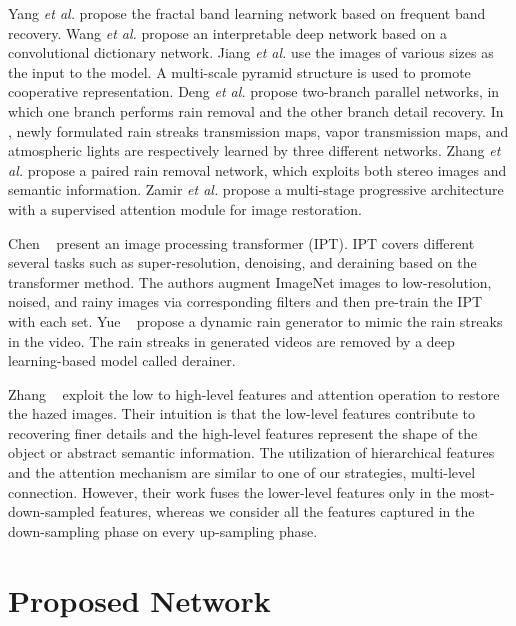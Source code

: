 \documentclass[a4paper,fleqn]{cas-dc}
\newcommand{\etal}[1]{\textit{et al.}{#1}}
\begin{document}
Yang \textit{et al.} \cite{yang2020towards} propose the fractal band learning network based on frequent band recovery. Wang \textit{et al.} \cite{wang2020model} propose an interpretable deep network based on a convolutional dictionary network. Jiang \textit{et al.} \cite{jiang2020multi} use the images of various sizes as the input to the model. A multi-scale pyramid structure is used to promote cooperative representation. Deng \textit{et al.} \cite{deng2020detail} propose two-branch parallel networks, in which one branch performs rain removal and the other branch detail recovery. In \cite{wang2020rethinking}, newly formulated rain streaks transmission maps, vapor transmission maps, and atmospheric lights are respectively learned by three different networks. Zhang \textit{et al.} \cite{zhang2020beyond} propose a paired rain removal network, which exploits both stereo images and semantic information. Zamir \textit{et al.} \cite{zamir2021multi} propose a multi-stage progressive architecture with a supervised attention module for image restoration.

Chen \etal~\cite{chen2021pre} present an image processing transformer (IPT). IPT covers different several tasks such as super-resolution, denoising, and deraining based on the transformer method. The authors augment ImageNet images to low-resolution, noised, and rainy images via corresponding filters and then pre-train the IPT with each set. Yue \etal~\cite{yue2021semi} propose a dynamic rain generator to mimic the rain streaks in the video. The rain streaks in generated videos are removed by a deep learning-based model called derainer.

Zhang \etal~\cite{zhang2020multi} exploit the low to high-level features and attention operation to restore the hazed images. Their intuition is that the low-level features contribute to recovering finer details and the high-level features represent the shape of the object or abstract semantic information. The utilization of hierarchical features and the attention mechanism are similar to one of our strategies, multi-level connection. However, their work fuses the lower-level features only in the most-down-sampled features, whereas we consider all the features captured in the down-sampling phase on every up-sampling phase.



\section{Proposed Network}
\label{sec:proposed}
\end{document}
